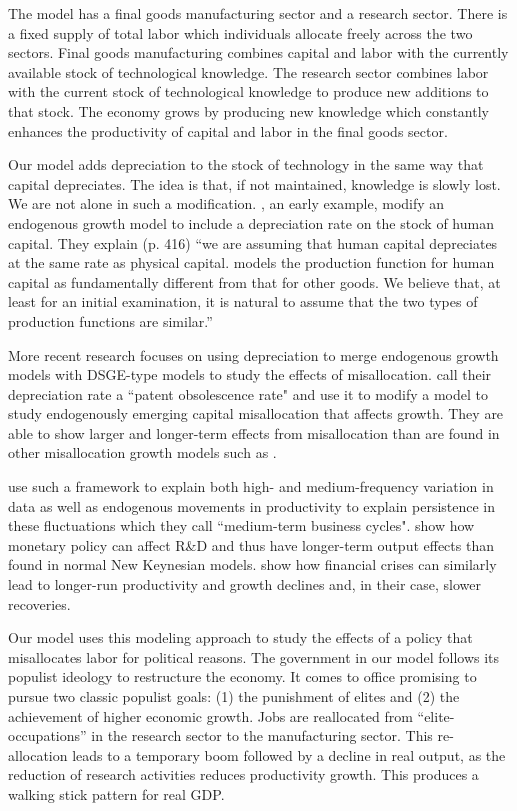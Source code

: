 \documentclass{OUP-EJ}
\begin{document}
The model has a final goods manufacturing sector and a research sector. There is a fixed supply of total labor which individuals allocate freely across the two sectors. Final goods manufacturing combines capital and labor with the currently available stock of technological knowledge. The research sector combines labor with the current stock of technological knowledge to produce new additions to that stock. The economy grows by producing new knowledge which constantly enhances the productivity of capital and labor in the final goods sector.

Our model adds depreciation to the stock of technology in the same way that capital depreciates. The idea is that, if not maintained, knowledge is slowly lost.  We are not alone in such a modification.  \cite{MankiwRomerWeil1992}, an early example, modify an endogenous growth model to include a depreciation rate on the stock of human capital.  They explain (p. 416) “we are assuming that human capital depreciates at the same rate as physical capital. \cite{Lucas1988} models the production function for human capital as fundamentally different from that for other goods. We believe that, at least for an initial examination, it is natural to assume that the two types of production functions are similar.”

More recent research focuses on using depreciation to merge endogenous growth models with DSGE-type models to study the effects of misallocation. \cite{DouEtAl2024} call their depreciation rate a ``patent obsolescence rate" and use it to modify a \cite{Romer1990} model to study endogenously emerging capital misallocation that affects growth. They are able to show larger and longer-term effects from misallocation than are found in other misallocation growth models such as \cite{Moll2014}. 

\cite{CominGertler2006} use such a framework to explain both high- and medium-frequency variation in data as well as endogenous movements in productivity to explain persistence in these fluctuations which they call ``medium-term business cycles".   \cite{MoranQueralto2018} show how monetary policy can affect R\&D and thus have longer-term output effects than found in normal New Keynesian models. \cite{AnzoateguiEtAl2019} show how financial crises can similarly lead to longer-run productivity and growth declines and, in their case, slower recoveries.

Our model uses this modeling approach to study the effects of a policy that misallocates labor for political reasons.  The government in our model follows its populist ideology to restructure the economy. It comes to office promising to pursue two classic populist goals: (1) the punishment of elites and (2) the achievement of higher economic growth.  Jobs are reallocated from “elite-occupations” in the research sector to the manufacturing sector. This re-allocation leads to a temporary boom followed by a decline in real output, as the reduction of research activities reduces productivity growth. This produces a walking stick pattern for real GDP.
\end{document}
